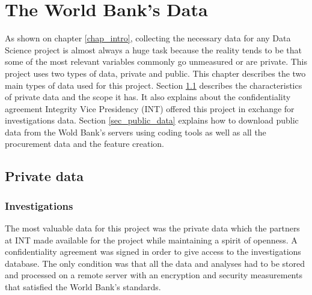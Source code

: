 \chapter{The World Bank's Data}\label{chap_data}

As shown on chapter \ref{chap_intro}, collecting the necessary data for any Data Science project is almost always a huge task because the reality tends to be that some of the most relevant variables commonly go unmeasured or are private. This project uses  two types of data, private and public. This chapter describes the two main types of data used for this project.
Section \ref{sec_inv_data} describes the characteristics of private data and the scope it has. It also explains about the confidentiality agreement Integrity Vice Presidency (INT) offered this project in exchange for investigations data. Section \ref{sec_public_data} explains how to download public data from the Wold Bank's servers using coding tools as well as all the procurement data and the feature creation.

\section{Private data} \label{sec_inv_data}
\subsection{Investigations} 

The most valuable data for this project was the private data which the partners at INT made available for the project while maintaining a spirit of openness. A confidentiality agreement was signed in order to give access to the investigations database. The only condition was that all the data and analyses had to be stored and processed on a remote server with an encryption and security measurements that satisfied the World Bank's standards. 

